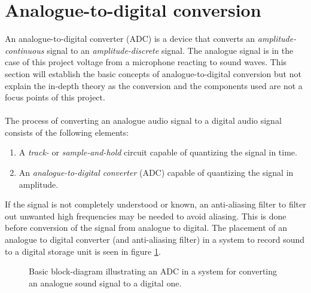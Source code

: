 \section{Analogue-to-digital conversion} \label{ADC}
An analogue-to-digital converter (ADC) is a device that converts an \textit{amplitude-continuous} signal to an \textit{amplitude-discrete} signal.  The analogue signal is in the case of this project voltage from a microphone reacting to sound waves. This section will establish the basic concepts of analogue-to-digital conversion but not explain the in-depth theory as the conversion and the components used are not a focus points of this project.
\\ \\
The process of converting an analogue audio signal to a digital audio signal consists of the following elements:
\begin{enumerate}
\item A \textit{track-} or \textit{sample-and-hold} circuit capable of quantizing the signal in time.
\item An \textit{analogue-to-digital converter} (ADC) capable of quantizing the signal in amplitude.
\end{enumerate}
If the signal is not completely understood or known, an anti-aliasing filter to filter out unwanted high frequencies may be needed to avoid aliasing. This is done before conversion of the signal from analogue to digital. The placement of an analogue to digital converter (and anti-aliasing filter) in a system to record sound to a digital storage unit is seen in figure \ref{fig:input}.
\begin{figure}[H]
\centering
{}
\caption{Basic block-diagram illustrating an ADC in a system for converting an analogue sound signal to a digital one.} 
\label{fig:input}
\end{figure}
%

